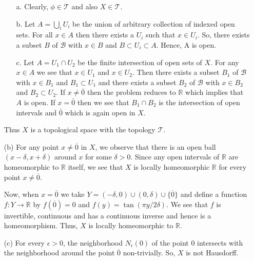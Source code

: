 \begin{solution}
\begin{enumerate}
        \begin{enumerate}
            \item[a.] Clearly, $\phi \in \mathscr{T}$ and
                also $X\in \mathscr{T}$.
            \item[b.] Let $A=\bigcup_i{U_i}$ be the union
                of arbitrary collection of indexed open sets.
                For all $x\in A$ then there exists a $U_i$ such
                that $x\in U_i$. So, there exists a
                subset $B$ of $\mathscr{B}$ with $x \in B$
                and $B \subset U_i\subset A$. Hence, A is open.
            \item[c.] Let $A=U_1\cap U_2$ be the finite
                intersection of open sets of $X$. For any
                $x\in A$ we see that $x\in U_1$ and 
                $x\in U_2$. Then
                there exists a
            subset $B_1$ of $\mathscr{B}$ with $x \in B_1$
            and $B_1 \subset U_1$ and there exists a
            subset $B_2$ of $\mathscr{B}$ with $x \in B_2$
            and $B_2 \subset U_2$. If $x\neq \bar{0}$
            then the problem reduces to $\mathbb{R}$ which implies
            that $A$ is open. If $x=\bar{0}$ then we see that
            $B_1\cap B_2$ is the intersection of open intervals and
            $\bar{0}$ which is again open in $X$.
        \end{enumerate}

        Thus $X$ is a topological space with the topology
        $\mathscr{T}$.

    \item[(b)] For any point $x\neq \overline{0}$ in $X$,
            we observe that
            there is an open ball $(x-\delta,x+\delta)$
            around $x$ for some $\delta>0$.
            Since any open intervals of
            $\mathbb{R}$ are homeomorphic to $\mathbb{R}$
            itself, we see that $X$ is locally
            homeomorphic
            $\mathbb{R}$ for every point
            $x\neq \overline{0}$.

            \vspace*{2mm}
            Now, when $x=\overline{0}$ we take
            $Y=(-\delta,0)\cup(0,\delta)\cup
            \{\overline{0}\}$ and define a function
            $f:Y\to \mathbb{R}$ by $f(\overline{0})
            =0$ and $f(y)=\tan{(\pi y/2\delta)}$.
            We see that $f$ is invertible, continuous
            and has a continuous inverse and hence is a
            homeomorphism. Thus, $X$ is locally
            homeomorphic to $\mathbb{R}$.

    \item[(c)] 
    For every $\epsilon>0$, the neighborhood
    $N_\epsilon(0)$
    of the point 0 intersects with the neighborhood
    around the point $\overline{0}$
    non-trivially. So, $X$ is
    not Hausdorff.
    \end{enumerate}
\end{solution}